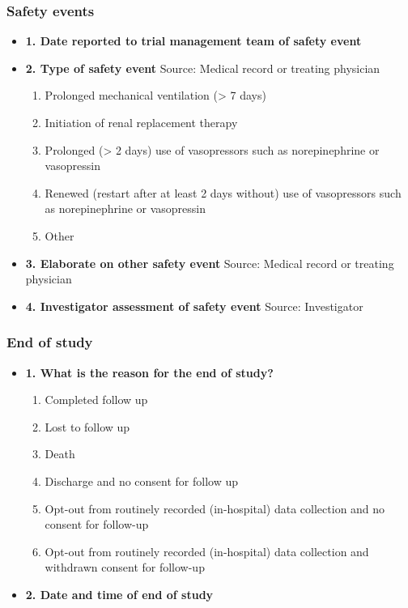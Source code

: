\documentclass[
]{scrartcl}
\providecommand{\tightlist}{%
  \setlength{\itemsep}{0pt}\setlength{\parskip}{0pt}}\usepackage{longtable,booktabs,array}
\begin{document}
\hypertarget{safety-events}{%
\subsubsection{Safety events}\label{safety-events}}

\begin{itemize}
\item
  \textbf{1. Date reported to trial management team of safety event}
\item
  \textbf{2. Type of safety event} Source: Medical record or treating
  physician

  \begin{enumerate}
  \def\labelenumi{\arabic{enumi}.}
  \tightlist
  \item
    Prolonged mechanical ventilation (\textgreater{} 7 days)
  \item
    Initiation of renal replacement therapy
  \item
    Prolonged (\textgreater{} 2 days) use of vasopressors such as
    norepinephrine or vasopressin
  \item
    Renewed (restart after at least 2 days without) use of vasopressors
    such as norepinephrine or vasopressin
  \item
    Other
  \end{enumerate}
\item
  \textbf{3. Elaborate on other safety event} Source: Medical record or
  treating physician
\item
  \textbf{4. Investigator assessment of safety event} Source:
  Investigator
\end{itemize}

\hypertarget{end-of-study}{%
\subsubsection{End of study}\label{end-of-study}}

\begin{itemize}
\tightlist
\item
  \textbf{1. What is the reason for the end of study?}

  \begin{enumerate}
  \def\labelenumi{\arabic{enumi}.}
  \tightlist
  \item
    Completed follow up
  \item
    Lost to follow up
  \item
    Death
  \item
    Discharge and no consent for follow up
  \item
    Opt-out from routinely recorded (in-hospital) data collection and no
    consent for follow-up
  \item
    Opt-out from routinely recorded (in-hospital) data collection and
    withdrawn consent for follow-up
  \end{enumerate}
\item
  \textbf{2. Date and time of end of study}
\end{itemize}
\end{document}
